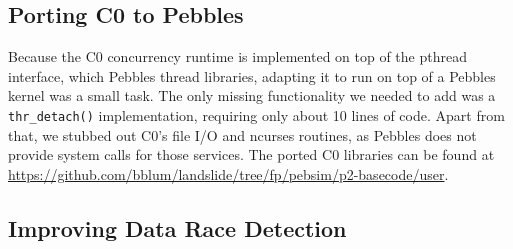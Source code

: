 \documentclass{article}
\begin{document}
\subsection{Porting C0 to Pebbles}

Because the C0 concurrency runtime is implemented on top of the pthread interface, which Pebbles thread libraries, adapting it to run on top of a Pebbles kernel was a small task. The only missing functionality we needed to add was a {\tt thr\_detach()} implementation, requiring only about 10 lines of code. Apart from that, we stubbed out C0's file I/O and ncurses routines, as Pebbles does not provide system calls for those services.
The ported C0 libraries can be found at \url{https://github.com/bblum/landslide/tree/fp/pebsim/p2-basecode/user}.

\subsection{Improving Data Race Detection}

\newcommand\hilight[2]{\color{#1}#2\color{black}}
\end{document}
